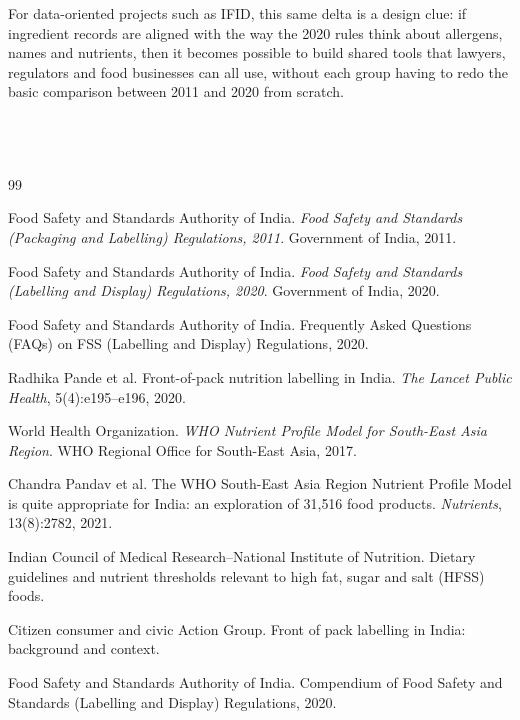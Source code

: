 \documentclass[12pt,a4paper]{article}
\begin{document}
For data-oriented projects such as IFID, this same delta is a design clue: if ingredient records are aligned with the way the 2020 rules think about allergens, names and nutrients, then it becomes possible to build shared tools that lawyers, regulators and food businesses can all use, without each group having to redo the basic comparison between 2011 and 2020 from scratch.
\\\\
\\\\

\begin{thebibliography}{99}

Food Safety and Standards Authority of India.
\newblock \emph{Food Safety and Standards (Packaging and Labelling) Regulations, 2011}.
\newblock Government of India, 2011.

Food Safety and Standards Authority of India.
\newblock \emph{Food Safety and Standards (Labelling and Display) Regulations, 2020}.
\newblock Government of India, 2020.

Food Safety and Standards Authority of India.
\newblock Frequently Asked Questions (FAQs) on FSS (Labelling and Display) Regulations, 2020.

Radhika Pande et al.
\newblock Front-of-pack nutrition labelling in India.
\newblock \emph{The Lancet Public Health}, 5(4):e195--e196, 2020.

World Health Organization.
\newblock \emph{WHO Nutrient Profile Model for South-East Asia Region}.
\newblock WHO Regional Office for South-East Asia, 2017.

Chandra Pandav et al.
\newblock The WHO South-East Asia Region Nutrient Profile Model is quite appropriate for India: an exploration of 31{,}516 food products.
\newblock \emph{Nutrients}, 13(8):2782, 2021.

Indian Council of Medical Research--National Institute of Nutrition.
\newblock Dietary guidelines and nutrient thresholds relevant to high fat, sugar and salt (HFSS) foods.


Citizen consumer and civic Action Group.
\newblock Front of pack labelling in India: background and context.

Food Safety and Standards Authority of India.
\newblock Compendium of Food Safety and Standards (Labelling and Display) Regulations, 2020.


\end{thebibliography}
\end{document}
